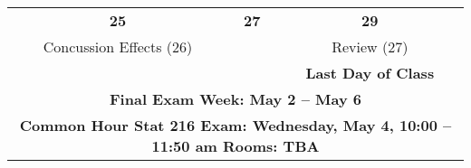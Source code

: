\begin{center}
\begin{tabular}{|c|c|c|}
 \hfill\bf{25} & \hfill\bf{27} & \hfill\bf{29} \\
  Concussion Effects \small{(26)}
 &
 & Review    \small{(27)}
\\
  & & \small\bf{ Last Day of Class}  \\ \hline

  \multicolumn{3}{|c|}{\textbf{Final Exam Week: May 2 -- May 6 }} \\
  \multicolumn{3}{|c|}{\bf{ Common Hour Stat 216  Exam: 
      Wednesday, May 4, 10:00 -- 11:50 am Rooms: TBA}} \\
\hline

\end{tabular}
\vspace{.2in} \\
\end{center}


